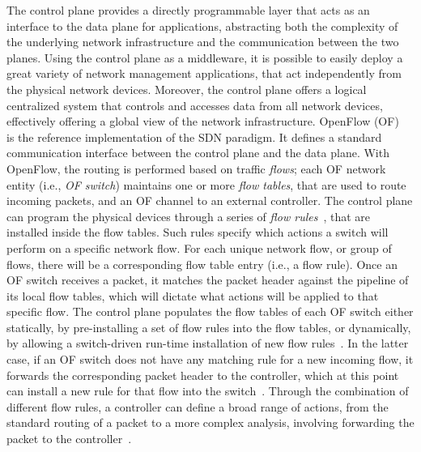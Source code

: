 \documentclass{sig-alternate}
\begin{document}
The control plane provides a directly programmable layer that acts as an interface to the data plane for applications, abstracting both the complexity of the underlying network infrastructure and the communication between the two planes.
Using the control plane as a middleware, it is possible to easily deploy a great variety of network management applications, that act independently from the physical network devices. 
Moreover, the control plane offers a logical centralized system that controls and accesses data from all network devices, effectively offering a global view of the network infrastructure.
OpenFlow (OF)~\cite{openflow_whitepaper} is the reference implementation of the SDN paradigm. It defines a standard communication interface between the control plane and the data plane. 
With OpenFlow, the routing is performed based on traffic {\em flows}; each OF network entity (i.e., {\em OF switch}) maintains one or more {\em flow tables}, that are used to route incoming packets, and an OF channel to an external controller. 
The control plane can program the physical devices through a series of {\em flow rules}~\cite{openflow_switch_specs}, 
that are installed inside the flow tables. Such rules specify which actions a switch will perform on a specific network flow.
For each unique network flow, or group of flows, there will be a corresponding flow table entry (i.e., a flow rule). 
Once an OF switch receives a packet, it matches the packet header against the pipeline of its local flow tables, which will dictate what actions will be applied to that specific flow.
The control plane populates the flow tables of each OF switch either statically, by pre-installing a set of flow rules into the flow tables, 
or dynamically, by allowing a switch-driven run-time installation of new flow rules~\cite{openflow_whitepaper}. 
In the latter case, if an OF switch does not have any matching rule for a new incoming flow, it forwards the corresponding packet header to the controller, 
which at this point can install a new rule for that flow into the switch~\cite{openflow_switch_specs}.
Through the combination of different flow rules, a controller can define a broad range of actions, 
from the standard routing of a packet to a more complex analysis, involving forwarding the packet to the controller~\cite{openflow_switch_specs}.
\end{document}
